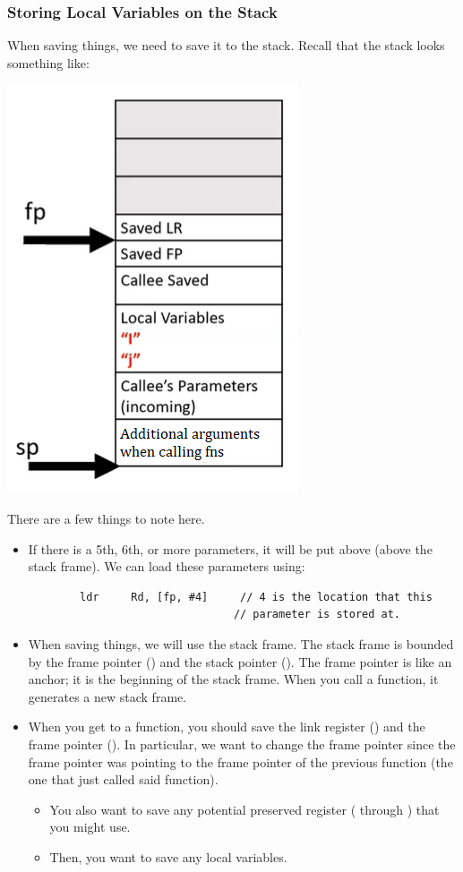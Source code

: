 \documentclass[letterpaper]{article}
\begin{document}
\subsubsection{Storing Local Variables on the Stack}
When saving things, we need to save it to the stack. Recall that the stack looks something like:
\begin{center}
    \includegraphics[scale=0.6]{img/i2.PNG}
\end{center}
There are a few things to note here.
\begin{itemize}
    \item If there is a 5th, 6th, or more parameters, it will be put above  (above the stack frame). We can load these parameters using:
    \begin{verbatim}
        ldr     Rd, [fp, #4]     // 4 is the location that this 
                                // parameter is stored at. 
    \end{verbatim}
    \item When saving things, we will use the stack frame. The stack frame is bounded by the frame pointer () and the stack pointer (). The frame pointer is like an anchor; it is the beginning of the stack frame. When you call a function, it generates a new stack frame. 
    \item When you get to a function, you should save the link register () and the frame pointer (). In particular, we want to change the frame pointer since the frame pointer was pointing to the frame pointer of the previous function (the one that just called said function). 
    \begin{itemize}
        \item You also want to save any potential preserved register ( through ) that you might use. 
        \item Then, you want to save any local variables. 
    \end{itemize}
\end{itemize}
\end{document}
